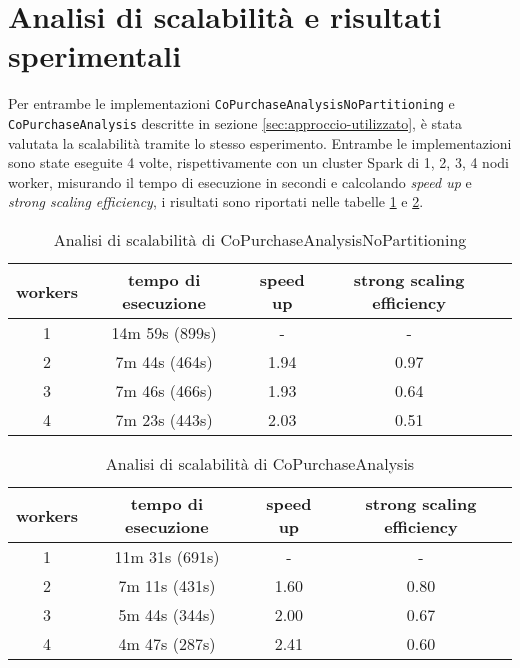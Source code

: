 \documentclass{article}
\begin{document}
\section{Analisi di scalabilità e risultati sperimentali} \label{sec:analisi-scalabilita}

Per entrambe le implementazioni \verb|CoPurchaseAnalysisNoPartitioning| e \verb|CoPurchaseAnalysis| descritte in sezione \ref{sec:approccio-utilizzato}, è stata valutata la scalabilità tramite lo stesso esperimento.
Entrambe le implementazioni sono state eseguite 4 volte, rispettivamente con un cluster Spark di 1, 2, 3, 4 nodi worker, misurando il tempo di esecuzione in secondi e calcolando \textit{speed up} e \textit{strong scaling efficiency}, i risultati sono riportati nelle tabelle \ref{tab:scalabilità-CoPurchaseAnalysisNoPartitioning} e \ref{tab:scalabilità-CoPurchaseAnalysis}.

\begin{table}[h!]
    \centering
    \begin{tabular}{ccccc}
        \hline
        \textbf{workers} & \textbf{tempo di esecuzione} & \textbf{speed up} & \textbf{strong scaling efficiency} \\ 
        \hline
        1 & 14m 59s (899s) & - & - \\
        2 & 7m 44s (464s) & 1.94 & 0.97 \\
        3 & 7m 46s (466s) & 1.93 & 0.64 \\
        4 & 7m 23s (443s) & 2.03 & 0.51 \\
        \hline
    \end{tabular}
    \caption{Analisi di scalabilità di CoPurchaseAnalysisNoPartitioning}
    \label{tab:scalabilità-CoPurchaseAnalysisNoPartitioning}
\end{table}

\begin{table}[h!]
    \centering
    \begin{tabular}{cccc}
        \hline
        \textbf{workers} & \textbf{tempo di esecuzione} & \textbf{speed up} & \textbf{strong scaling efficiency} \\ 
        \hline
        1 & 11m 31s (691s) & - & - \\
        2 & 7m 11s (431s) & 1.60 & 0.80 \\
        3 & 5m 44s (344s) & 2.00 & 0.67 \\
        4 & 4m 47s (287s) & 2.41 & 0.60 \\
        \hline
    \end{tabular}
    \caption{Analisi di scalabilità di CoPurchaseAnalysis}
    \label{tab:scalabilità-CoPurchaseAnalysis}
\end{table}
\end{document}
